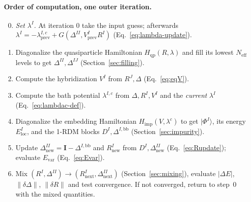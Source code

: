 \documentclass[11pt]{article}
\newcommand{\Neff}{N_{\mathrm{eff}}}
\newcommand{\Hqp}{H_{\mathrm{qp}}}
\newcommand{\Himp}{H_{\mathrm{imp}}}
\begin{document}
\paragraph{Order of computation, one outer iteration.}
\begin{enumerate}
  \setcounter{enumi}{-1}
  \item \emph{Set $\lambda^I$.} At iteration $0$ take the input guess;
    afterwards $\lambda^I=-\lambda^{I,c}_{\mathrm{prev}}+G(\Delta^{II},V^I_{\mathrm{prev}}R^I)$
    (Eq.~\eqref{eq:lambda-update}).
  \item Diagonalize the quasiparticle Hamiltonian $\Hqp(R,\lambda)$ and fill
    its lowest $\Neff$ levels to get $\Delta^{II},\Delta^{IJ}$
    (Section~\ref{sec:filling}).
  \item Compute the hybridization $V^I$ from $R^J,\Delta$ (Eq.~\eqref{eq:eqV}).
  \item Compute the bath potential $\lambda^{I,c}$ from $\Delta,R^I,V^I$ and
    the \emph{current} $\lambda^I$ (Eq.~\eqref{eq:lambdac-def}).
  \item Diagonalize the embedding Hamiltonian $\Himp(V,\lambda^c)$ to get
    $|\Phi^I\rangle$, its energy $E^I_{\mathrm{loc}}$, and the 1-RDM blocks
    $D^I,\Delta^{I,\mathrm{bb}}$ (Section~\ref{sec:impurity}).
  \item Update $\Delta^{II}_{\mathrm{new}}=\mathbf I-\Delta^{I,\mathrm{bb}}$ and
    $R^I_{\mathrm{new}}$ from $D^I,\Delta^{II}_{\mathrm{new}}$
    (Eq.~\eqref{eq:Rupdate}); evaluate $E_{\mathrm{var}}$ (Eq.~\eqref{eq:Evar}).
  \item Mix $(R^I,\Delta^{II})\to(R^I_{\mathrm{next}},\Delta^{II}_{\mathrm{next}})$
    (Section~\ref{sec:mixing}), evaluate $\lvert\Delta E\rvert$,
    $\lVert\delta\Delta\rVert$, $\lVert\delta R\rVert$ and test convergence.
    If not converged, return to step~0 with the mixed quantities.
\end{enumerate}
\end{document}
